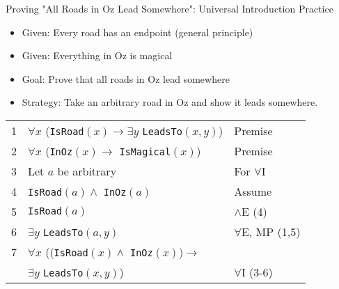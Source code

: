 \documentclass{beamer}
\begin{document}
	\begin{frame}{Proving "All Roads in Oz Lead Somewhere": Universal Introduction Practice}
		\begin{itemize}
			\item Given: Every road has an endpoint (general principle)
			\item Given: Everything in Oz is magical  
			\item Goal: Prove that all roads in Oz lead somewhere
			\item Strategy: Take an arbitrary road in Oz and show it leads somewhere.
		\end{itemize}
		
		\begin{example}
			\begin{tabular}{|c|l|l|}
				\hline
				1 & $\forall x$ (\texttt{IsRoad}$(x) \rightarrow \exists y$ \texttt{LeadsTo}$(x,y)$) & Premise \\
				2 & $\forall x$ (\texttt{InOz}$(x) \rightarrow$ \texttt{IsMagical}$(x)$) & Premise \\
				\hline
				3 & \quad Let $a$ be arbitrary & For $\forall$I \\
				4 & \quad \texttt{IsRoad}$(a) \land$ \texttt{InOz}$(a)$ & Assume \\
				5 & \quad \texttt{IsRoad}$(a)$ & $\land$E (4) \\
				6 & \quad $\exists y$ \texttt{LeadsTo}$(a,y)$ & $\forall$E, MP (1,5) \\
				\hline
				7 & $\forall x$ ((\texttt{IsRoad}$(x) \land$ \texttt{InOz}$(x)) \rightarrow$ & \\
				& $\exists y$ \texttt{LeadsTo}$(x,y)$) & $\forall$I (3-6) \\
				\hline
			\end{tabular}
		\end{example}
	\end{frame}
	
\end{document}
